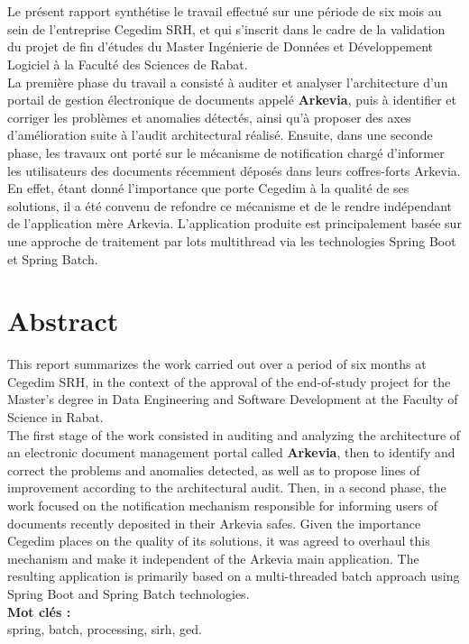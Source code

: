 {}
\noindent \section*{\abstractname}
Le présent rapport synthétise le travail effectué sur une période de six mois au sein de l'entreprise Cegedim SRH, et qui s'inscrit dans le cadre de la validation du projet de fin d'études du Master Ingénierie de Données et Développement Logiciel à la Faculté des Sciences de Rabat.\\

La première phase du travail a consisté à auditer et analyser l'architecture d'un portail de gestion électronique de documents appelé \textbf{Arkevia}, puis à identifier et corriger les problèmes et anomalies détectés, ainsi qu'à proposer des axes d'amélioration suite à l'audit architectural réalisé. Ensuite, dans une seconde phase, les travaux ont porté sur le mécanisme de notification chargé d'informer les utilisateurs des documents récemment déposés dans leurs coffres-forts Arkevia. En effet, étant donné l’importance que porte Cegedim à la qualité de ses solutions, il a été convenu de refondre ce mécanisme et de le rendre indépendant de l'application mère Arkevia. L'application produite est principalement basée sur une approche de traitement par lots multithread via les technologies Spring Boot et Spring Batch.
\noindent \section*{Abstract}
This report summarizes the work carried out over a period of six months at Cegedim SRH, in the context of the approval of the end-of-study project for the Master's degree in Data Engineering and Software Development at the Faculty of Science in Rabat.\\
	
The first stage of the work consisted in auditing and analyzing the architecture of an electronic document management portal called \textbf{Arkevia}, then to identify and correct the problems and anomalies detected, as well as to propose lines of improvement according to the architectural audit. Then, in a second phase, the work focused on the notification mechanism responsible for informing users of documents recently deposited in their Arkevia safes. Given the importance Cegedim places on the quality of its solutions, it was agreed to overhaul this mechanism and make it independent of the Arkevia main application. The resulting application is primarily based on a multi-threaded batch approach using Spring Boot and Spring Batch technologies.\\
\textbf{Mot clés :}\\
spring, batch, processing, sirh, ged.
\newpage